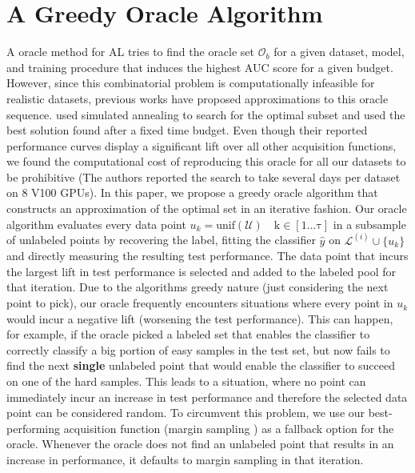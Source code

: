 \documentclass[]{article}
\begin{document}
\section{A Greedy Oracle Algorithm}\label{sec:oracle}
A oracle method for AL tries to find the oracle set $\mathcal{O}_b$ for a given dataset, model, and training procedure that induces the highest AUC score for a given budget.
However, since this combinatorial problem is computationally infeasible for realistic datasets, previous works have proposed approximations to this oracle sequence. 
\cite{zhou2021towards} used simulated annealing to search for the optimal subset and used the best  solution found after a fixed time budget. 
Even though their reported performance curves display a significant lift over all other acquisition functions, we found the computational cost of reproducing this oracle for all our datasets to be prohibitive (The authors reported the search to take several days per dataset on 8 V100 GPUs).
In this paper, we propose a greedy oracle algorithm that constructs an approximation of the optimal set in an iterative fashion.
Our oracle algorithm evaluates every data point $u_k = \operatorname{unif(\mathcal{U}) \quad k \in [1 \ldots \tau]}$ in a subsample of unlabeled points by recovering the label, fitting the classifier $\hat y$ on $\mathcal{L}^{(i)} \cup \{u_k\}$ and directly measuring the resulting test performance.
The data point that incurs the largest lift in test performance is selected and added to the labeled pool for that iteration.
Due to the algorithms greedy nature (just considering the next point to pick), our oracle frequently encounters situations where every point in $u_k$ would incur a negative lift (worsening the test performance).
This can happen, for example, if the oracle picked a labeled set that enables the classifier to correctly classify a big portion of easy samples in the test set, but now fails to find the next \textbf{single} unlabeled point that would enable the classifier to succeed on one of the hard samples.
This leads to a situation, where no point can immediately incur an increase in test performance and therefore the selected data point can be considered random.
To circumvent this problem, we use our best-performing acquisition function (margin sampling \cite{wang2014new}) as a fallback option for the oracle.
Whenever the oracle does not find an unlabeled point that results in an increase in performance, it defaults to margin sampling in that iteration.
\end{document}
